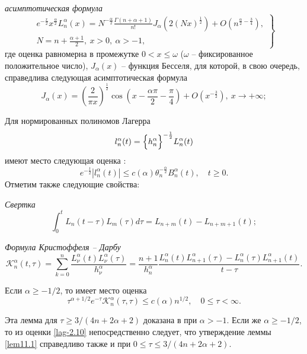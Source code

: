 \textit{асимптотическая формула}
\begin{equation*}
\left.\begin{gathered}
e^{-\frac{x}{2}}x^{\frac{\alpha}{2}}L_n^\alpha(x)=N^{-\frac{\alpha}{2}}\frac{\Gamma(n+\alpha+1)}{n!}J_\alpha\left(2(Nx)^\frac{1}{2}\right)
+O\left(n^{\frac{\alpha}{2}-\frac{3}{4}}\right),\\
N=n+\frac{\alpha+1}{2},\ x>0, \ \alpha>-1,
\end{gathered}\right\}
\end{equation*}
где оценка равномерна в промежутке $0<x\leq\omega$ ($\omega$ -- фиксированное положительное число), $J_\alpha(x)$ -- функция Бесселя, для которой, в свою очередь, справедлива следующая асимптотическая формула
\begin{equation*}
J_\alpha(x)=\left(\frac{2}{\pi x}\right)^{\frac{1}{2}}\cos\left(x-\frac{\alpha\pi}{2}-\frac{\pi}{4}\right)+O\left(x^{-\frac{3}{2}}\right),\ x\rightarrow+\infty;
\end{equation*}

Для нормированных полиномов Лагерра
\begin{equation}\label{lag-2.12}
l_n^\alpha(t)=
\Bigl\{h_n^\alpha \Bigr\}^{-\frac{1}{2}} L_n^\alpha(t)
\end{equation}
имеют место следующая оценка \cite{AskeyWaiger}:
\begin{equation*}\label{lag-2.13}
e^{-\frac{t}{2}}
|l_n^\alpha(t)|\le
c(\alpha)\theta_n^{-\frac{\alpha}{2}}B_n^\alpha(t), \quad t \ge 0.
\end{equation*}
Отметим также следующие свойства:

\textit{Свертка}
\begin{equation}
\label{lag-2.15}
\int_0^{t} L_{n}(t-\tau) L_{m}(\tau) d\tau = L_{n+m}(t) - L_{n+m+1}(t);
\end{equation}

\textit{Формула Кристоффеля -- Дарбу}
\begin{equation}\label{lag-2.16}
\mathcal{K}_n^\alpha(t,\tau)=
\sum\limits_{k=0}^{n}\frac{L_\nu^\alpha(t)L_\nu^\alpha(\tau)}{h_\nu^\alpha}=
\frac{n+1}{h_n^\alpha}
\frac{L_n^\alpha(t)L_{n+1}^\alpha(\tau) - L_n^\alpha(\tau)L_{n+1}^\alpha(t)}{t-\tau}.
\end{equation}

\begin{lemma}\label{lem11.1}
	Если $\alpha\ge-1/2$, то имеет место оценка
	\begin{equation*}
	\tau^{\alpha+1/2}e^{-\tau}\mathcal{K}_{n}^\alpha(\tau,\tau)\le c(\alpha)n^{1/2}, \quad 0\le \tau<\infty.
	\end{equation*}
\end{lemma}
Эта лемма для $\tau\ge3/(4n+2\alpha+2)$ доказана в \cite{SharSMJ2017} при $\alpha>-1$. Если же $\alpha\ge-1/2$, то из оценки \eqref{lag-2.10} непосредственно следует, что утверждение леммы \ref{lem11.1} справедливо  также и при  $0\le\tau\le3/(4n+2\alpha+2)$.

